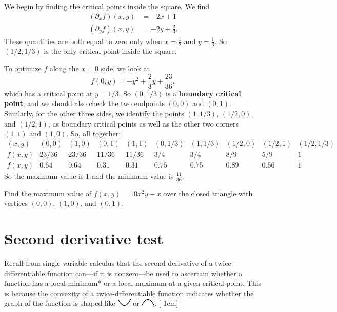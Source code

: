 \documentclass{watsonbook}
\begin{document}
\begin{solution}
  We begin by finding the critical points inside the square. We find
  \begin{align*}
    (\partial_xf)(x,y) &= -2x + 1  \\
    (\partial_yf)(x,y) &= -2y + \frac{2}{3}. 
  \end{align*}
  These quantities are both equal to zero only when $x =
  \tfrac{1}{2}$ and $y = \frac{1}{3}$. So $(1/2,1/3)$ is the only critical
  point inside the square.

  To optimize $f$ along the $x = 0$ side, we look at
  \[
    f(0,y) = -y^2 + \frac{2}{3}y + \frac{23}{36}, 
  \]
  which has a critical point at $y = 1/3$. So $(0,1/3)$ is a
  \textbf{boundary critical point}, and we should also check the two
  endpoints $(0,0)$ and $(0,1)$. Similarly, for the other three
  sides, we identify the points $(1,1/3)$, $(1/2,0)$, and $(1/2,1)$, as
  boundary critical points as well as the other two corners $(1,1)$
  and $(1,0)$. So, all together:
  \[
    \renewcommand\arraystretch{1.4}
    \begin{array}{c|ccccccccc}
      (x,y) &  (0,0) & (1,0) & (0,1) & (1,1) & (0,1/3) & (1,1/3) & (1/2,0) &
                                                                             (1/2,1)
      & (1/2,1/3) \\ \hline
      f(x,y) & 23/36 & 23/36 & 11/36 & 11/36 & 3/4 & 3/4 & 8/9 & 5/9
      & 1 \\
      f(x,y) & 0.64 & 0.64 & 0.31 & 0.31 & 0.75 & 0.75 & 0.89 & 0.56
      & 1
    \end{array}
  \]
  So the maximum value is $\boxed{1}$ and the minimum value is
  $\boxed{\tfrac{11}{36}}$. 
\end{solution}

\begin{exercise}{}{}
  Find the maximum value of $f(x,y) = 10x^2y-x$ over the closed
  triangle with vertices $(0,0)$, $(1,0)$, and $(0,1)$.
\end{exercise}

\section{Second derivative test} \label{sec:second_test}

Recall from single-variable calculus that the second derivative of a
twice-differentiable function can---if it is nonzero---be used to
ascertain whether a function has a local minimum* or a local maximum
at a given critical point. This is because the convexity of a
twice-differentiable function indicates whether the graph of the
function is shaped like \includegraphics{figures/smallup} or
\includegraphics{figures/smalldown}. [-1cm]
\end{document}

